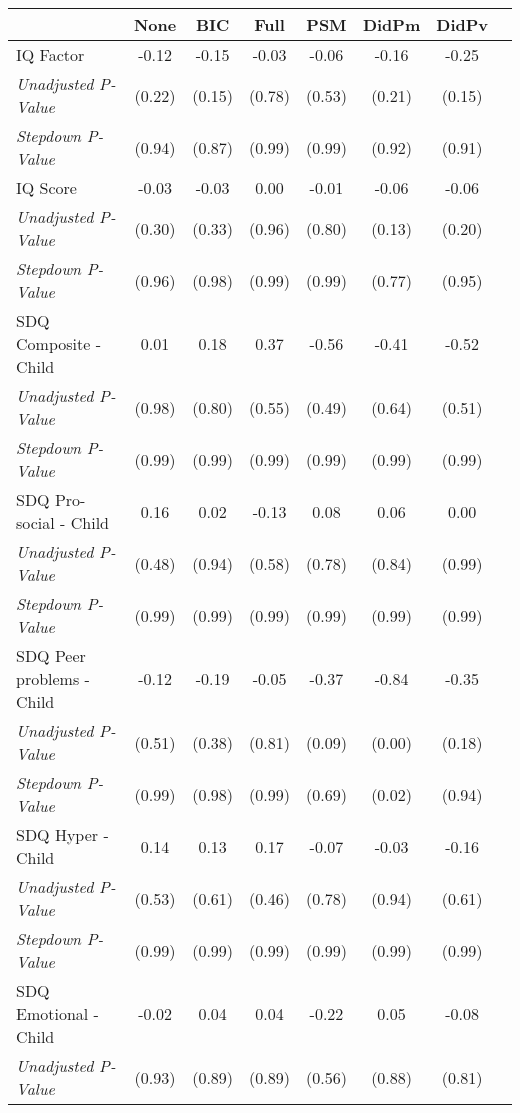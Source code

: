 \begin{tabular}{l c c c c c c c}
\toprule
 & None & BIC & Full & PSM & DidPm & DidPv \\
\midrule
IQ Factor & -0.12 & -0.15 & -0.03 & -0.06 & -0.16 & -0.25 \\
\quad \textit{Unadjusted P-Value} & (0.22) & (0.15) & (0.78) & (0.53) & (0.21) & (0.15) \\
\quad \textit{Stepdown P-Value} & (0.94) & (0.87) & (0.99) & (0.99) & (0.92) & (0.91) \\
IQ Score & -0.03 & -0.03 & 0.00 & -0.01 & -0.06 & -0.06 \\
\quad \textit{Unadjusted P-Value} & (0.30) & (0.33) & (0.96) & (0.80) & (0.13) & (0.20) \\
\quad \textit{Stepdown P-Value} & (0.96) & (0.98) & (0.99) & (0.99) & (0.77) & (0.95) \\
SDQ Composite - Child & 0.01 & 0.18 & 0.37 & -0.56 & -0.41 & -0.52 \\
\quad \textit{Unadjusted P-Value} & (0.98) & (0.80) & (0.55) & (0.49) & (0.64) & (0.51) \\
\quad \textit{Stepdown P-Value} & (0.99) & (0.99) & (0.99) & (0.99) & (0.99) & (0.99) \\
SDQ Pro-social - Child & 0.16 & 0.02 & -0.13 & 0.08 & 0.06 & 0.00 \\
\quad \textit{Unadjusted P-Value} & (0.48) & (0.94) & (0.58) & (0.78) & (0.84) & (0.99) \\
\quad \textit{Stepdown P-Value} & (0.99) & (0.99) & (0.99) & (0.99) & (0.99) & (0.99) \\
SDQ Peer problems - Child & -0.12 & -0.19 & -0.05 & -0.37 & -0.84 & -0.35 \\
\quad \textit{Unadjusted P-Value} & (0.51) & (0.38) & (0.81) & (0.09) & (0.00) & (0.18) \\
\quad \textit{Stepdown P-Value} & (0.99) & (0.98) & (0.99) & (0.69) & (0.02) & (0.94) \\
SDQ Hyper - Child & 0.14 & 0.13 & 0.17 & -0.07 & -0.03 & -0.16 \\
\quad \textit{Unadjusted P-Value} & (0.53) & (0.61) & (0.46) & (0.78) & (0.94) & (0.61) \\
\quad \textit{Stepdown P-Value} & (0.99) & (0.99) & (0.99) & (0.99) & (0.99) & (0.99) \\
SDQ Emotional - Child & -0.02 & 0.04 & 0.04 & -0.22 & 0.05 & -0.08 \\
\quad \textit{Unadjusted P-Value} & (0.93) & (0.89) & (0.89) & (0.56) & (0.88) & (0.81) \\

\end{tabular}
